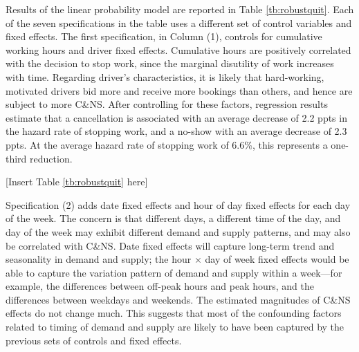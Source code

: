 \documentclass[reviewmode,AEJ]{AEA}
\begin{document}
Results of the linear probability model are reported in Table \ref{tb:robustquit}. Each of the seven 
specifications in the table uses a different set of control variables and fixed effects. 
The first specification, in Column (1), controls for cumulative working hours and driver fixed effects.
Cumulative hours are positively correlated with the decision to stop work, since the marginal disutility 
of work increases with time. Regarding driver's characteristics, it is likely that hard-working, motivated
drivers bid more and receive more bookings than others, and hence are subject to more C\&NS. After 
controlling for these factors, regression results estimate that a cancellation is associated with an
average decrease of 2.2 ppts in the hazard rate of stopping work, and a no-show with an average decrease
of 2.3 ppts. At the average hazard rate of stopping work of 6.6\%, this represents a one-third reduction.

\begin{center}
	[Insert Table \ref{tb:robustquit} here]
\end{center}

Specification (2) adds date fixed effects and hour of day fixed effects for each day of the week. 
The concern is that different days, a different time of the day, and day of the week may exhibit different
demand and supply patterns, and may also be correlated with C\&NS. Date fixed effects will capture long-term
trend and seasonality in demand and supply; the hour $\times$ day of week fixed effects would be able to capture
the variation pattern of demand and supply within a week---for example, the differences between off-peak hours
and peak hours, and the differences between weekdays and weekends. The estimated magnitudes of C\&NS effects 
do not change much. This suggests that most of the confounding factors related to timing of demand and supply
are likely to have been captured by the previous sets of controls and fixed effects. 
\end{document}
